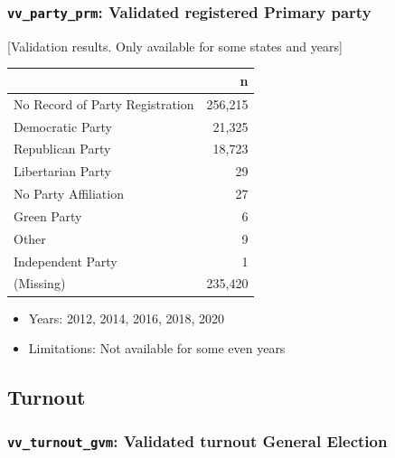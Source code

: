 \documentclass[10pt,article,oneside]{memoir}
\theoremstyle{definition}
\begin{document}
\hypertarget{vv_party_prm-validated-registered-primary-party}{%
\subsubsection{\texorpdfstring{\texttt{vv\_party\_prm}: Validated
registered Primary
party}{vv\_party\_prm: Validated registered Primary party}}\label{vv_party_prm-validated-registered-primary-party}}

{[}Validation results. Only available for some states and years{]}

\begin{table}[H]
\centering
\begin{tabular}[t]{lr}
\toprule
 & n\\
\midrule
No Record of Party Registration & 256,215\\
Democratic Party & 21,325\\
Republican Party & 18,723\\
Libertarian Party & 29\\
No Party Affiliation & 27\\
Green Party & 6\\
Other & 9\\
Independent Party & 1\\
(Missing) & 235,420\\
\bottomrule
\end{tabular}
\end{table}

\begin{itemize}
\tightlist
\item
  Years: 2012, 2014, 2016, 2018, 2020
\item
  Limitations: Not available for some even years
\end{itemize}

\newpage

\hypertarget{turnout}{%
\subsection{Turnout}\label{turnout}}

\hypertarget{vv_turnout_gvm-validated-turnout-general-election}{%
\subsubsection{\texorpdfstring{\texttt{vv\_turnout\_gvm}: Validated
turnout General
Election}{vv\_turnout\_gvm: Validated turnout General Election}}\label{vv_turnout_gvm-validated-turnout-general-election}}
\end{document}
